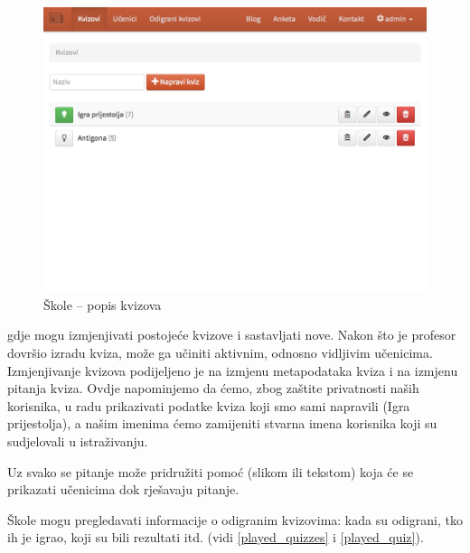 \documentclass[11pt]{scrreprt}
\begin{document}
\begin{figure}[H]
  \includegraphics[width=\textwidth, clip=true, trim=0 10cm 0 0, fbox]{school/quizzes}
  \caption{Škole -- popis kvizova}
  \label{fig:school/quizzes}
\end{figure}

gdje mogu izmjenjivati postojeće kvizove i sastavljati nove. Nakon što je
profesor dovršio izradu kviza, može ga učiniti aktivnim, odnosno vidljivim
učenicima. Izmjenjivanje kvizova podijeljeno je na izmjenu metapodataka kviza i
na izmjenu pitanja kviza. Ovdje napominjemo da ćemo, zbog zaštite privatnosti
naših korisnika, u radu prikazivati podatke kviza koji smo sami napravili (Igra
prijestolja), a našim imenima ćemo zamijeniti stvarna imena korisnika koji su
sudjelovali u istraživanju.

Uz svako se pitanje može pridružiti pomoć (slikom ili tekstom) koja će se
prikazati učenicima dok rješavaju pitanje.

Škole mogu pregledavati informacije o odigranim kvizovima: kada su odigrani,
tko ih je igrao, koji su bili rezultati itd. (vidi \ref{played_quizzes} i
\ref{played_quiz}).
\end{document}
